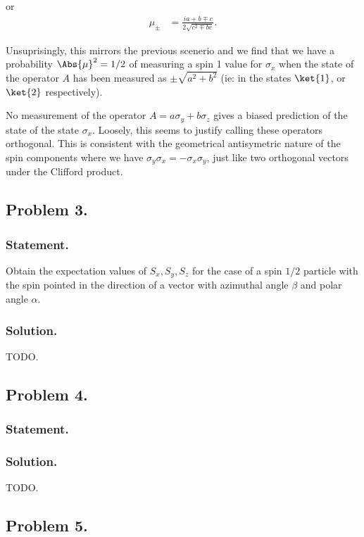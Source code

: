 or
\begin{align}\label{eqn:desaiCh5:212}
\mu_{\pm} &= 
\frac{ia + b \mp c}{2 \sqrt{c^2 \mp bc}} .
\end{align}

Unsuprisingly, this mirrors the previous scenerio and we find that we have a probability $\Abs{\mu}^2 = 1/2$ of measuring a spin 1 value for $\sigma_x$ when the state of the operator $A$ has been measured as $\pm \sqrt{a^2 + b^2}$ (ie: in the states $\ket{1}$, or $\ket{2}$ respectively).

No measurement of the operator $A = a \sigma_y + b\sigma_z$ gives a biased prediction of the state of the state $\sigma_x$.  Loosely, this seems to justify calling these operators orthogonal.  This is consistent with the geometrical antisymetric nature of the spin components where we have $\sigma_y \sigma_x = -\sigma_x \sigma_y$, just like two orthogonal vectors under the Clifford product.

\subsection{Problem 3.}
\subsubsection{Statement.}

Obtain the expectation values of $S_x, S_y, S_z$ for the case of a spin $1/2$ particle with the spin pointed in the direction of a vector with azimuthal angle $\beta$ and polar angle $\alpha$.

\subsubsection{Solution.}

TODO.

\subsection{Problem 4.}
\subsubsection{Statement.}
\subsubsection{Solution.}

TODO.

\subsection{Problem 5.}
